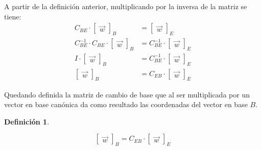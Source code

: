 \documentclass[a5paper,12pt,twoside]{book}
\newtheorem{defn}{{Definición}}[chapter]
\begin{document}
A partir de la definición anterior, multiplicando por la inversa de la matriz se tiene:
\begin{align*}
    C_{BE} \cdot
    \begin{bmatrix}
        \Vec{w}
    \end{bmatrix}_B
    &=
    \begin{bmatrix}
        \Vec{w}
    \end{bmatrix}_E
    \\[1ex]
    C_{BE}^{-1} \cdot C_{BE} \cdot
    \begin{bmatrix}
        \Vec{w}
    \end{bmatrix}_B
    &= C_{BE}^{-1} \cdot
    \begin{bmatrix}
        \Vec{w}
    \end{bmatrix}_E
    \\[1ex]
    I \cdot
    \begin{bmatrix}
        \Vec{w}
    \end{bmatrix}_B
    &= C_{BE}^{-1} \cdot
    \begin{bmatrix}
        \Vec{w}
    \end{bmatrix}_E
    \\[1ex]
    \begin{bmatrix}
        \Vec{w}
    \end{bmatrix}_B
    &= C_{EB} \cdot
    \begin{bmatrix}
        \Vec{w}
    \end{bmatrix}_E
\end{align*}

Quedando definida la matriz de cambio de base que al ser multiplicada por un vector en base canónica da como resultado las coordenadas del vector en base $B$.

\begin{mdframed}[style=DefinitionFrame]
    \begin{defn}
    \end{defn}
    \begin{equation*}
        \begin{bmatrix}
            \Vec{w}
        \end{bmatrix}_B
        = C_{EB} \cdot
        \begin{bmatrix}
            \Vec{w}
        \end{bmatrix}_E
    \end{equation*}
\end{mdframed}
\end{document}
